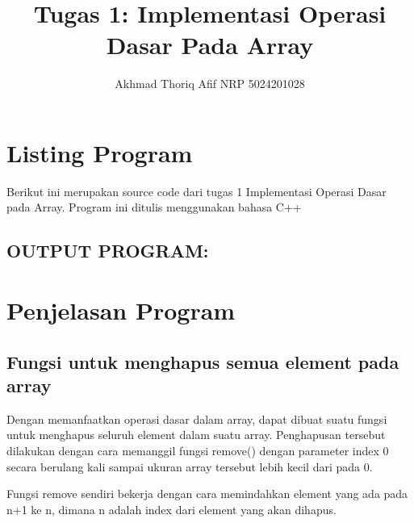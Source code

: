 \documentclass[]{article}
\title{Tugas 1: Implementasi Operasi Dasar Pada Array}
\author{Akhmad Thoriq Afif NRP 5024201028}
\begin{document}
\maketitle
\section{Listing Program}
Berikut ini merupakan source code dari tugas 1 Implementasi Operasi Dasar pada Array. Program ini ditulis menggunakan bahasa C++

\subsection*{OUTPUT PROGRAM:}
\pagebreak
\section{Penjelasan Program}
\subsection{Fungsi untuk menghapus semua element pada array}

\par
Dengan memanfaatkan operasi dasar dalam array, dapat dibuat suatu fungsi untuk menghapus seluruh element dalam suatu array. Penghapusan tersebut dilakukan dengan cara memanggil fungsi remove() dengan parameter index 0 secara berulang kali sampai ukuran array tersebut lebih kecil dari pada 0.
\par
Fungsi remove sendiri bekerja dengan cara memindahkan element yang ada pada n+1 ke n, dimana n adalah index dari element yang akan dihapus.
\end{document}
